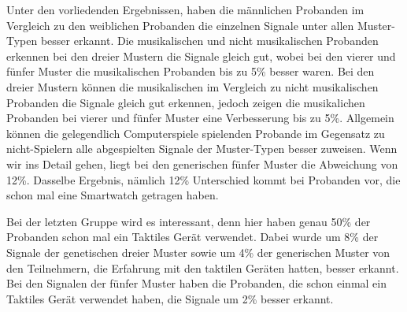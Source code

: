 Unter den vorliedenden Ergebnissen, haben die m{\"a}nnlichen Probanden im Vergleich zu den weiblichen Probanden die einzelnen Signale unter allen Muster-Typen besser erkannt.
Die musikalischen und nicht musikalischen Probanden erkennen bei den dreier Mustern die Signale gleich gut, wobei bei den vierer und f{\"u}nfer Muster die musikalischen Probanden bis zu 5\% besser waren.
Bei den dreier Mustern k{\"o}nnen die musikalischen im Vergleich zu nicht musikalischen Probanden die Signale gleich gut erkennen, jedoch zeigen die musikalichen Probanden bei vierer und f{\"u}nfer Muster eine Verbesserung bis zu 5\%.
Allgemein k{\"o}nnen die gelegendlich Computerspiele spielenden Probande im Gegensatz zu nicht-Spielern alle abgespielten Signale der Muster-Typen besser zuweisen. Wenn wir ins Detail gehen, liegt bei den generischen f{\"u}nfer Muster die Abweichung von 12\%.
Dasselbe Ergebnis, n{\"a}mlich 12\% Unterschied kommt bei Probanden vor, die schon mal eine Smartwatch getragen haben.

Bei der letzten Gruppe wird es interessant, denn hier haben genau 50\% der Probanden schon mal ein Taktiles Ger{\"a}t verwendet. 
Dabei wurde um 8\% der Signale der genetischen dreier Muster sowie um 4\% der generischen Muster von den Teilnehmern, die Erfahrung mit den taktilen Ger{\"a}ten hatten, besser erkannt.
Bei den Signalen der f{\"u}nfer Muster haben die Probanden, die schon einmal ein Taktiles Ger{\"a}t verwendet haben, die Signale um 2\% besser erkannt.

